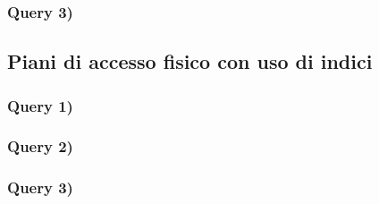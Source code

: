 \documentclass[a4paper,12pt]{article}
\begin{document}
 \subsubsection{ Query 3) }

 \subsection{ Piani di accesso fisico con uso di indici }

 \subsubsection{ Query 1) }

 \subsubsection{ Query 2) }

 \subsubsection{ Query 3) }
\end{document}
